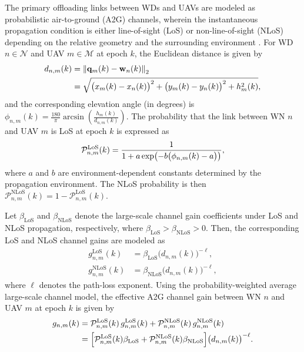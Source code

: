 \documentclass[journal]{IEEEtran}
\begin{document}
The primary offloading links between WDs and UAVs are modeled as 
probabilistic air-to-ground (A2G) channels, wherein the instantaneous propagation condition is either line-of-sight (LoS) or non-line-of-sight (NLoS) depending on the relative geometry and the surrounding environment 
\cite{11500527}. For WD $n\in\mathcal{N}$ and UAV $m\in\mathcal{M}$ at epoch 
$k$, the Euclidean distance is given by
\begin{equation}
\small
\begin{split}
    d_{n,m}(k)
    &= \left\|\mathbf{q}_m(k)-\mathbf{w}_n(k)\right\|_2 \\
    &= \sqrt{\bigl(x_m(k)-x_n(k)\bigr)^2
    + \bigl(y_m(k)-y_n(k)\bigr)^2
    + h_m^2(k)} ,
\end{split}
\label{eq:dist_wd_uav}
\end{equation}
and the corresponding elevation angle (in degrees) is $\phi_{n,m}(k)
    = \frac{180}{\pi}
    \arcsin\!\left(\frac{h_m(k)}{d_{n,m}(k)}\right).
\label{eq:elev_angle}$ The probability that the link between WN $n$ and UAV $m$ is LoS at epoch $k$ is expressed as
\begin{equation}
\small
    \mathcal{P}^{\mathrm{LoS}}_{n,m}(k)
    = \frac{1}{1+a\exp\!\left(-b\bigl(\phi_{n,m}(k)-a\bigr)\right)},
\label{eq:los_prob}
\end{equation}
where $a$ and $b$ are environment-dependent constants determined by the
propagation environment. The NLoS probability is then $\mathcal{P}^{\mathrm{NLoS}}_{n,m}(k)
    = 1-\mathcal{P}^{\mathrm{LoS}}_{n,m}(k).
\label{eq:nlos_prob}$

Let $\beta_{\mathrm{LoS}}$ and $\beta_{\mathrm{NLoS}}$ denote the
large-scale channel gain coefficients under LoS and NLoS propagation,
respectively, where $\beta_{\mathrm{LoS}}>\beta_{\mathrm{NLoS}}>0$.
Then, the corresponding LoS and NLoS channel gains are modeled as
\begin{align}
    g_{n,m}^{\mathrm{LoS}}(k)
    &= \beta_{\mathrm{LoS}}\bigl(d_{n,m}(k)\bigr)^{-\ell},
\label{eq:gain_los}\\
    g_{n,m}^{\mathrm{NLoS}}(k)
    &= \beta_{\mathrm{NLoS}}\bigl(d_{n,m}(k)\bigr)^{-\ell},
\label{eq:gain_nlos}
\end{align}
where $\ell$ denotes the path-loss exponent. Using the probability-weighted average large-scale channel model, the effective A2G channel gain between WN $n$ and UAV $m$ at epoch $k$ is given by
\begin{equation}
\small
\begin{split}
    g_{n,m}(k)
    &= \mathcal{P}^{\mathrm{LoS}}_{n,m}(k)\,
    g_{n,m}^{\mathrm{LoS}}(k)
    + \mathcal{P}^{\mathrm{NLoS}}_{n,m}(k)\,
    g_{n,m}^{\mathrm{NLoS}}(k) \\
    &= \Bigl[
    \mathcal{P}^{\mathrm{LoS}}_{n,m}(k)\beta_{\mathrm{LoS}}
    + \mathcal{P}^{\mathrm{NLoS}}_{n,m}(k)\beta_{\mathrm{NLoS}}
    \Bigr]
    \bigl(d_{n,m}(k)\bigr)^{-\ell}.
\end{split}
\label{eq:channel_gain_a2g}
\end{equation}
\end{document}
